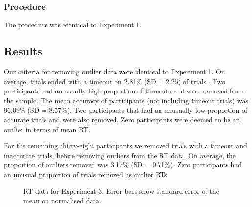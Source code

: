 \documentclass[
  man,
  floatsintext,
  longtable,
  nolmodern,
  notxfonts,
  notimes,
  colorlinks=true,linkcolor=blue,citecolor=blue,urlcolor=blue]{apa7}
\begin{document}
\subsubsection{Procedure}\label{procedure-2}

The procedure was identical to Experiment 1.

\subsection{Results}\label{results-2}

Our criteria for removing outlier data were identical to Experiment 1.
On average, trials ended with a timeout on 2.81\% (SD = 2.25) of trials
. Two participants had an usually high proportion of timeouts and were
removed from the sample. The mean accuracy of participants (not
including timeout trials) was 96.09\% (SD = 8.57\%). Two participants
that had an unusually low proportion of accurate trials and were also
removed. Zero participants were deemed to be an outlier in terms of mean
RT.

For the remaining thirty-eight participants we removed trials with a
timeout and inaccurate trials, before removing outliers from the RT
data. On average, the proportion of outliers removed was 3.17\% (SD =
0.71\%). Zero participants had an unusual proportion of trials removed
as outlier RTs.

\begin{figure}[H]


\caption{\label{fig-RT-exp3}RT data for Experiment 3. Error bars show
standard error of the mean on normalised data.}

\end{figure}%
\end{document}
